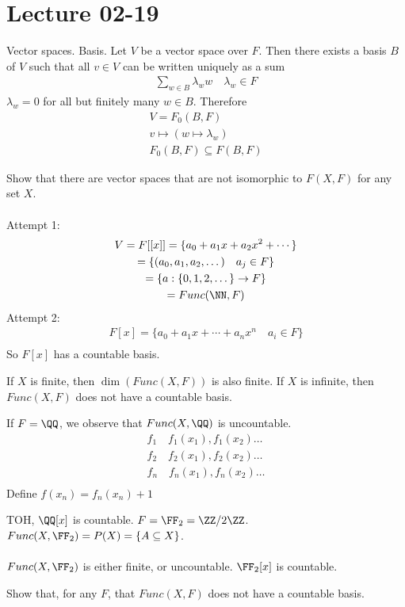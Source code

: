 \documentclass[class=scrartcl, crop=false]{standalone}
\date{2020-02-19}
\begin{document}
\section{Lecture 02-19}

Vector spaces. Basis. Let $V$ be a vector space over $F$. Then there exists a basis $B$ of $V$ such that all $v \in V$ can be written uniquely as a sum 
\begin{gather*}
  \sum_{w \in B}\lambda_w w \quad \lambda_w \in F
\end{gather*} 
$\lambda_w = 0$ for all but finitely many $w \in B$. %
Therefore
\begin{gather*}
  V = F_0(B, F) \\
  v \mapsto (w \mapsto \lambda_w) \\
  F_0(B, F) \subseteq F(B, F)
\end{gather*} 

\begin{exercise}
  Show that there are vector spaces that are not isomorphic to $F(X, F)$ for any set $X$.
  \\\\
  Attempt 1:
  \begin{gather*}
    V = F[[x]] = \{a_0 + a_1x + a_2x^2 + \cdots\} \\
    = \{(a_0, a_1, a_2, \dots) \quad a_j \in F\} \\
    = \{a: \{0, 1, 2, \dots\} \to F \} \\
    = Func(\NN, F)
  \end{gather*} 
  Attempt 2:
  \begin{gather*}
    F[x] = \{a_0 + a_1x + \cdots + a_n x^n \quad a_i \in F\} \\
  \end{gather*} 
  So $F[x]$ has a countable basis. 
  \begin{enumerate}
    \ii
    If $X$ is finite, then $\dim(Func(X, F))$ is also finite.
    \ii
    If $X$ is infinite, then $Func(X, F)$ does not have a countable basis. %
  \end{enumerate} 
  If $F = \QQ$, we observe that $Func(X, \QQ)$ is uncountable.
  \begin{gather*}
    f_1 \quad f_1(x_1), f_1(x_2) \dots \\
    f_2 \quad f_2(x_1), f_2(x_2) \dots \\
    f_n \quad f_n(x_1), f_n(x_2) \dots \\
  \end{gather*} 
  Define $f(x_n) = f_n(x_n) + 1$ %
   \begin{enumerate}
    \ii
    TOH, $\QQ[x]$ is countable.
    \ii
    $F = \FF_2 = \ZZ / 2\ZZ$. $Func(X, \FF_2) = P(X) = \{A \subseteq X\}$.
    \\\\
    $Func(X, \FF_2)$ is either finite, or uncountable. $\FF_2[x]$ is countable.
  \end{enumerate} 
\end{exercise} 
\begin{exercise}
  Show that, for any $F$, that $Func(X, F)$ does not have a countable basis.
\end{exercise} 
\end{document}
